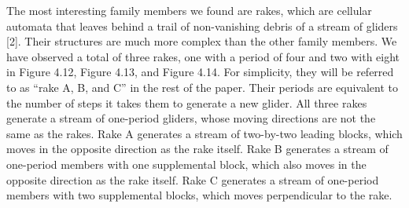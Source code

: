 \documentclass[12pt]{article}
\numberwithin{figure}{section} %
\begin{document}
The most interesting family members we found are rakes, which are cellular automata that leaves behind a trail of non-vanishing debris of a stream of gliders [2]. Their structures are much more complex than the other family members. We have observed a total of three rakes, one with a period of four and two with eight in Figure 4.12, Figure 4.13, and Figure 4.14. For simplicity, they will be referred to as “rake A, B, and C” in the rest of the paper. Their periods are equivalent to the number of steps it takes them to generate a new glider. All three rakes generate a stream of one-period gliders, whose moving directions are not the same as the rakes. Rake A generates a stream of two-by-two leading blocks, which moves in the opposite direction as the rake itself. Rake B generates a stream of one-period members with one supplemental block, which also moves in the opposite direction as the rake itself. Rake C generates a stream of one-period members with two supplemental blocks, which moves perpendicular to the rake. 
\end{document}
